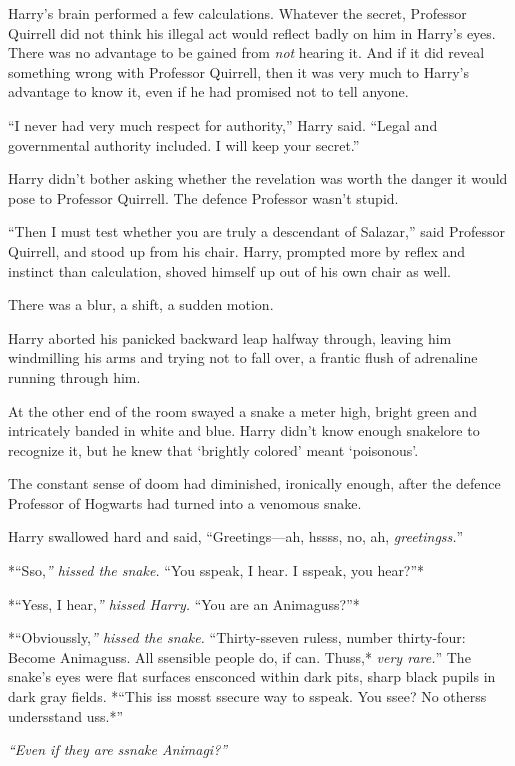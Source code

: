 Harry's brain performed a few calculations. Whatever the secret,
Professor Quirrell did not think his illegal act would reflect badly on
him in Harry's eyes. There was no advantage to be gained from \emph{not}
hearing it. And if it did reveal something wrong with Professor
Quirrell, then it was very much to Harry's advantage to know it, even if
he had promised not to tell anyone.

``I never had very much respect for authority,'' Harry said. ``Legal and
governmental authority included. I will keep your secret.''

Harry didn't bother asking whether the revelation was worth the danger
it would pose to Professor Quirrell. The defence Professor wasn't
stupid.

``Then I must test whether you are truly a descendant of Salazar,'' said
Professor Quirrell, and stood up from his chair. Harry, prompted more by
reflex and instinct than calculation, shoved himself up out of his own
chair as well.

There was a blur, a shift, a sudden motion.

Harry aborted his panicked backward leap halfway through, leaving him
windmilling his arms and trying not to fall over, a frantic flush of
adrenaline running through him.

At the other end of the room swayed a snake a meter high, bright green
and intricately banded in white and blue. Harry didn't know enough
snakelore to recognize it, but he knew that `brightly colored' meant
`poisonous'.

The constant sense of doom had diminished, ironically enough, after the
defence Professor of Hogwarts had turned into a venomous snake.

Harry swallowed hard and said, ``Greetings---ah, hssss, no, ah,
\emph{greetingss.}''

*``Sso,\emph{'' hissed the snake. }``You sspeak, I hear. I sspeak, you
hear?''*

*``Yess, I hear,\emph{'' hissed Harry. }``You are an Animaguss?''*

*``Obvioussly,\emph{'' hissed the snake. }``Thirty-sseven ruless, number
thirty-four: Become Animaguss. All ssensible people do, if can. Thuss,*
\emph{very rare.}'' The snake's eyes were flat surfaces ensconced within
dark pits, sharp black pupils in dark gray fields. *``This iss mosst
ssecure way to sspeak. You ssee? No otherss undersstand uss.*''

\emph{``Even if they are ssnake Animagi?''}

